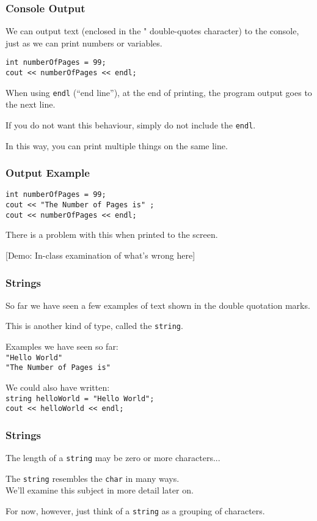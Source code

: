 \begin{frame}
\frametitle{Console Output}

We can output text (enclosed in the " double-quotes character) to the console, just as we can print numbers or variables.

\texttt{int numberOfPages = 99;}\\
\texttt{cout << numberOfPages << endl;}

When using \texttt{endl} (``end line''), at the end of printing, the program output goes to the next line.

If you do not want this behaviour, simply do not include the \texttt{endl}.

In this way, you can print multiple things on the same line.

\end{frame}

\begin{frame}
\frametitle{Output Example}

\texttt{int numberOfPages = 99;}\\
\texttt{cout << "The Number of Pages is" ;}\\
\texttt{cout <<  numberOfPages << endl;}

There is a problem with this when printed to the screen.

[Demo: In-class examination of what's wrong here]

\end{frame}

\begin{frame}
\frametitle{Strings}
So far we have seen a few examples of text shown in the double quotation marks.

This is another kind of type, called the \alert{\texttt{string}}.

Examples we have seen so far:\\
\texttt{"Hello World"}\\
\texttt{"The Number of Pages is"}

We could also have written:\\
\texttt{string helloWorld = "Hello World";}\\
\texttt{cout << helloWorld << endl;}

\end{frame}

\begin{frame}
\frametitle{Strings}
The length of a \texttt{string} may be zero or more characters...

The \texttt{string} resembles the \texttt{char} in many ways.\\
\quad We'll examine this subject in more detail later on.

For now, however, just think of a \texttt{string} as a grouping of characters.

\end{frame}

